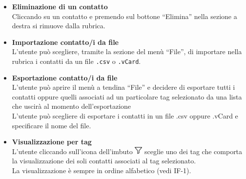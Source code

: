 \begin{tcolorbox}[colback=white,colframe=black!80!white,title=\textbf{Funzionalità individuali IF}]
\begin{itemize}[itemsep=2pt, topsep=0pt, label=\textbf{\IFitem}]
		\item \textbf{Eliminazione di un contatto}
		\\Cliccando su un contatto e premendo sul bottone “Elimina” nella sezione a destra si rimuove dalla rubrica.
		
		\item \textbf{Importazione contatto/i da file}
		\\L’utente può scegliere, tramite la sezione del menù “File”, di importare nella rubrica i contatti da un file \texttt{.csv} o \texttt{.vCard}.
		
		\item \textbf{Esportazione contatto/i da file}
		\\L’utente può aprire il menù a tendina “File” e decidere di esportare 
		tutti i contatti oppure quelli associati ad un particolare tag selezionato 
		da una lista che uscirà al momento dell’esportazione 
		\\L’utente può scegliere di esportare i contatti in un file .csv oppure 
		.vCard e specificare il nome del file. 
		
		\item \textbf{Visualizzazione per tag}
		\\L’utente cliccando sull’icona dell’imbuto \includegraphics[height=0.4cm]{images/WhatsApp Image 2024-11-22 at 16.28.56.jpeg} sceglie uno dei tag che comporta la visualizzazione dei soli contatti associati al tag selezionato.
		\\La visualizzazione è sempre in ordine alfabetico (vedi IF-1).
		
	\end{itemize}
\end{tcolorbox}

